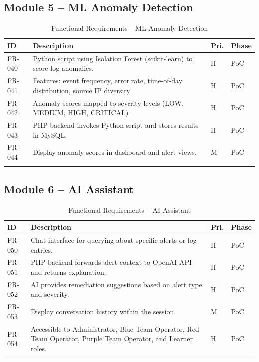 \documentclass[12pt,a4paper]{report}
\begin{document}
	\subsection{Module 5 -- ML Anomaly Detection}
	\begin{longtable}{L{1.6cm} L{7.8cm} C{1.2cm} C{1.4cm}}
		\toprule
		\textbf{ID} & \textbf{Description} & \textbf{Pri.} & \textbf{Phase} \\
		\midrule
		FR-040 & Python script using Isolation Forest (scikit-learn) to score log anomalies. & H & PoC \\
		FR-041 & Features: event frequency, error rate, time-of-day distribution, source IP diversity. & H & PoC \\
		FR-042 & Anomaly scores mapped to severity levels (LOW, MEDIUM, HIGH, CRITICAL). & H & PoC \\
		FR-043 & PHP backend invokes Python script and stores results in MySQL. & H & PoC \\
		FR-044 & Display anomaly scores in dashboard and alert views. & M & PoC \\
		\bottomrule
		\caption{Functional Requirements -- ML Anomaly Detection}
	\end{longtable}
	
	\subsection{Module 6 -- AI Assistant}
	\begin{longtable}{L{1.6cm} L{7.8cm} C{1.2cm} C{1.4cm}}
		\toprule
		\textbf{ID} & \textbf{Description} & \textbf{Pri.} & \textbf{Phase} \\
		\midrule
		FR-050 & Chat interface for querying about specific alerts or log entries. & H & PoC \\
		FR-051 & PHP backend forwards alert context to OpenAI API and returns explanation. & H & PoC \\
		FR-052 & AI provides remediation suggestions based on alert type and severity. & H & PoC \\
		FR-053 & Display conversation history within the session. & M & PoC \\
		FR-054 & Accessible to Administrator, Blue Team Operator, Red Team Operator, Purple Team Operator, and Learner roles. & H & PoC \\
		\bottomrule
		\caption{Functional Requirements -- AI Assistant}
	\end{longtable}
	
\end{document}
